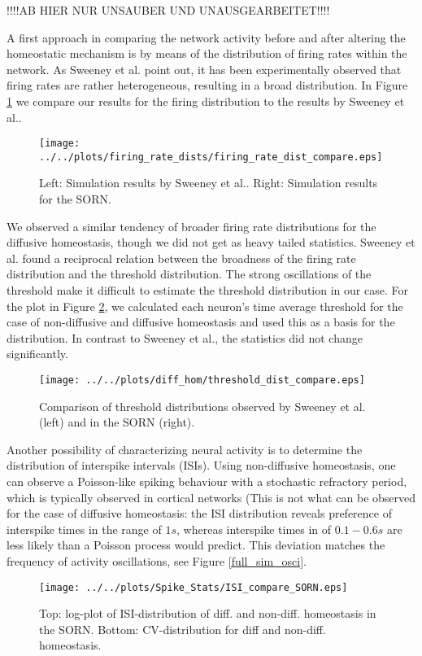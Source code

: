 \documentclass[10pt,a4paper]{article}
\begin{document}
!!!!AB HIER NUR UNSAUBER UND UNAUSGEARBEITET!!!!

A first approach in comparing the network activity before and after altering the homeostatic mechanism is by means of the distribution of firing rates within the network. As Sweeney et al. point out, it has been experimentally observed that firing rates are rather heterogeneous, resulting in a broad distribution. In Figure \ref{firing_rate_dist_comp} we compare our results for the firing distribution to the results by Sweeney et al.. 
\begin{figure}
\texttt{[image: ../../plots/firing\_rate\_dists/firing\_rate\_dist\_compare.eps]}
\caption{Left: Simulation results by Sweeney et al.. Right: Simulation results for the SORN.}
\label{firing_rate_dist_comp}
\end{figure}
We observed a similar tendency of broader firing rate distributions for the diffusive homeostasis, though we did not get as heavy tailed statistics. Sweeney et al. found a reciprocal relation between the broadness of the firing rate distribution and the threshold distribution. The strong oscillations of the threshold make it difficult to estimate the threshold distribution in our case. For the plot in Figure \ref{thresh_dist_comp}, we calculated each neuron's time average threshold for the case of non-diffusive and diffusive homeostasis and used this as a basis for the distribution. In contrast to Sweeney et al., the statistics did not change significantly.
\begin{figure}
\texttt{[image: ../../plots/diff\_hom/threshold\_dist\_compare.eps]}
\caption{Comparison of threshold distributions observed by Sweeney et al. (left) and in the SORN (right).}
\label{thresh_dist_comp}
\end{figure}



Another possibility of characterizing neural activity is to determine the distribution of interspike intervals (ISIs). Using non-diffusive homeostasis, one can observe a Poisson-like spiking behaviour with a stochastic refractory period, which is typically observed in cortical networks (This is not what can be observed for the case of diffusive homeostasis: the ISI distribution reveals preference of interspike times in the range of $1s$, whereas interspike times in of $0.1-0.6s$ are less likely than a Poisson process would predict. This deviation matches the frequency of activity oscillations, see Figure \ref{full_sim_osci}.
\begin{figure}
\texttt{[image: ../../plots/Spike\_Stats/ISI\_compare\_SORN.eps]}
\caption{Top: log-plot of ISI-distribution of diff. and non-diff. homeostasis in the SORN. Bottom: CV-distribution for diff and non-diff. homeostasis.}
\label{ISI_compare}
\end{figure}
\end{document}
